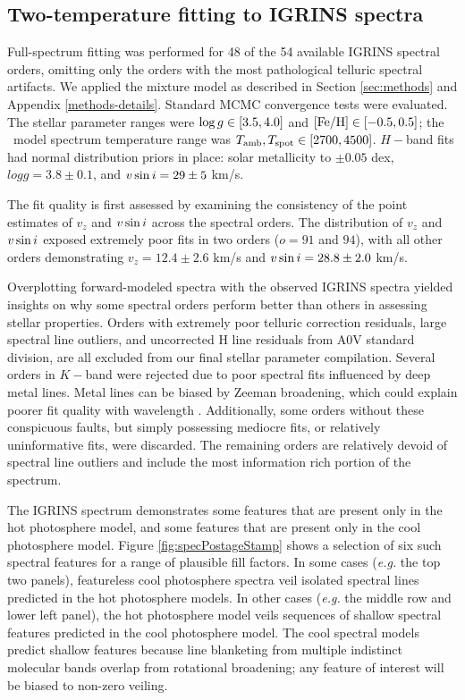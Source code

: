 \documentclass[twocolumn]{emulateapj}%
\begin{document}


\subsection{Two-temperature fitting to IGRINS spectra}\label{sec:two_tempIGRINS}


Full-spectrum fitting was performed for 48 of the 54 available IGRINS spectral orders, omitting only the orders with the most pathological telluric spectral artifacts. We applied the mixture model as described in Section \ref{sec:methods} and Appendix \ref{methods-details}.  Standard MCMC convergence tests were evaluated.  The stellar parameter ranges were $\log g \in [3.5, 4.0]$ and $[{\rm Fe}/{\rm H}] \in [-0.5, 0.5]$; the \PHOENIX\ model spectrum temperature range was $T_\textrm{amb}, T_\textrm{spot} \in [2700, 4500]$.  $H-$band fits had normal distribution priors in place: solar metallicity to $\pm0.05$ dex, $logg=3.8\pm0.1$, and $v \sin i=29\pm5$ km/s.

The fit quality is first assessed by examining the consistency of the point estimates of $v_z$ and $v \sin i$ across the spectral orders.  The distribution of $v_z$ and $v \sin i$ exposed extremely poor fits in two orders ($o=91$ and $94$), with all other orders demonstrating $v_z = 12.4 \pm 2.6$ km/s and $v \sin i = 28.8 \pm 2.0$ km/s.

Overplotting forward-modeled spectra with the observed IGRINS spectra yielded insights on why some spectral orders perform better than others in assessing stellar properties.  Orders with extremely poor telluric correction residuals, large spectral line outliers, and uncorrected H line residuals from A0V standard division, are all excluded from our final stellar parameter compilation.  Several orders in $K-$band were rejected due to poor spectral fits influenced by deep metal lines.  Metal lines can be biased by Zeeman broadening, which could explain poorer fit quality with wavelength \citep{johnskrull07,deen13}.  Additionally, some orders without these conspicuous faults, but simply possessing mediocre fits, or relatively uninformative fits, were discarded.  The remaining orders are relatively devoid of spectral line outliers and include the most information rich portion of the spectrum.

The IGRINS spectrum demonstrates some features that are present only in the hot photosphere model, and some features that are present only in the cool photosphere model.  Figure \ref{fig:specPostageStamp} shows a selection of six such spectral features for a range of plausible fill factors.  In some cases (\emph{e.g.} the top two panels), featureless cool photosphere spectra veil isolated spectral lines predicted in the hot photosphere models.  In other cases (\emph{e.g.} the middle row and lower left panel), the hot photosphere model veils sequences of shallow spectral features predicted in the cool photosphere model.  The cool spectral models predict shallow features because line blanketing from multiple indistinct molecular bands overlap from rotational broadening; any feature of interest will be biased to non-zero veiling.  
\end{document}
